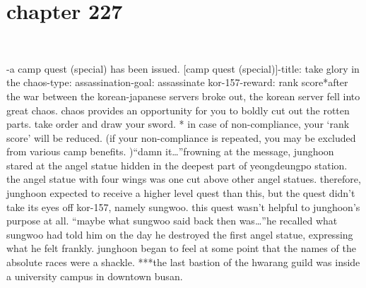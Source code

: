 \section{chapter 227}

                             




-a camp quest (special) has been issued.
[camp quest (special)]-title: take glory in the chaos-type: assassination-goal: assassinate kor-157-reward: rank score*after the war between the korean-japanese servers broke out, the korean server fell into great chaos.
 chaos provides an opportunity for you to boldly cut out the rotten parts.
 take order and draw your sword.
* in case of non-compliance, your ‘rank score’ will be reduced.
 (if your non-compliance is repeated, you may be excluded from various camp benefits.
)“damn it…”frowning at the message, junghoon stared at the angel statue hidden in the deepest part of yeongdeungpo station.
the angel statue with four wings was one cut above other angel statues.
 therefore, junghoon expected to receive a higher level quest than this, but the quest didn’t take its eyes off kor-157, namely sungwoo.
this quest wasn’t helpful to junghoon’s purpose at all.
“maybe what sungwoo said back then was…”he recalled what sungwoo had told him on the day he destroyed the first angel statue, expressing what he felt frankly.
junghoon began to feel at some point that the names of the absolute races were a shackle.
***the last bastion of the hwarang guild was inside a university campus in downtown busan.

